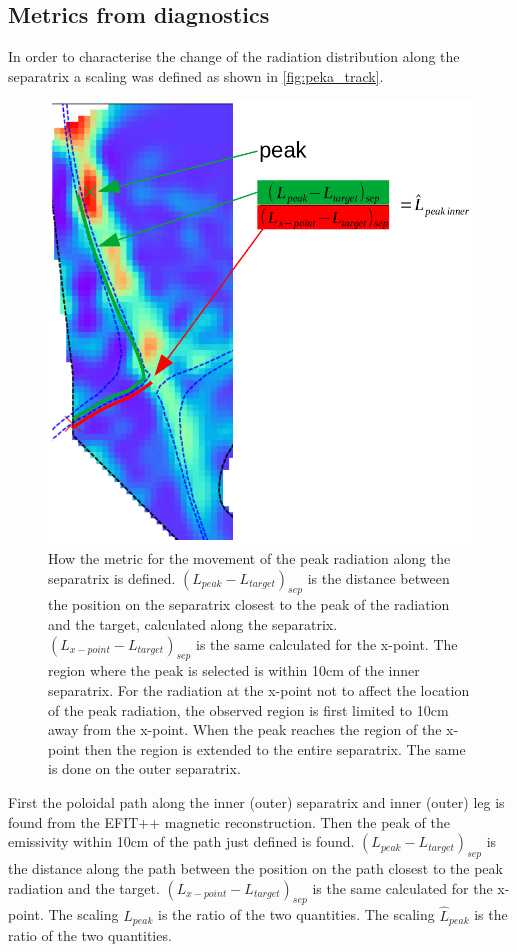 \subsection{Metrics from diagnostics}\label{Metrics from diagnostics}
In order to characterise the change of the radiation distribution along the separatrix a scaling was defined as shown in \autoref{fig:peka_track}.
\begin{figure}[!ht]
	\centering
	\includegraphics[trim={0 0 0 45},clip,width=0.6\linewidth]{Chapters/chapter2/figs/peak radiation tracking.png}
	\caption{How the metric for the movement of the peak radiation along the separatrix is defined. $(L_{peak}-L_{target})_{sep}$ is the distance between the position on the separatrix closest to the peak of the radiation and the target, calculated along the separatrix. $(L_{x-point}-L_{target})_{sep}$ is the same calculated for the x-point. The region where the peak is selected is within 10cm of the inner separatrix. For the radiation at the x-point not to affect the location of the peak radiation, the observed region is first limited to 10cm away from the x-point. When the peak reaches the region of the x-point then the region is extended to the entire separatrix. The same is done on the outer separatrix.}
	\label{fig:peka_track}
\end{figure}
First the poloidal path along the inner (outer) separatrix and inner (outer) leg is found from the EFIT++ magnetic reconstruction. Then the peak of the emissivity within 10cm of the path just defined is found. $(L_{peak}-L_{target})_{sep}$ is the distance along the path between the position on the path closest to the peak radiation and the target. $(L_{x-point}-L_{target})_{sep}$ is the same calculated for the x-point. The scaling $L_{peak}$ is the ratio of the two quantities. The scaling $\hat{L}_{peak}$ is the ratio of the two quantities.

